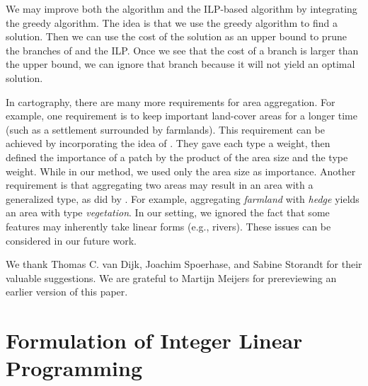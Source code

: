 \documentclass[acmsmall,natbib=false]{acmart}
\begin{document}
We may improve both the \Astar algorithm and the ILP-based 
algorithm by integrating the greedy algorithm.
The idea is that we use the greedy algorithm to find 
a solution. 
Then we can use the cost of the solution as an upper bound to 
prune the branches of \Astar and the ILP. 
Once we see that
the cost of a branch is larger than the upper bound,
we can ignore that branch  
because it will not yield an optimal solution.



In cartography, there are many more requirements 
for area aggregation.
For example, one requirement is 
to keep important land-cover areas for a longer time
(such as a settlement surrounded by farmlands).
This requirement can be achieved by incorporating the idea of
\textcite{Dilo2009tGAP}.
They gave each type a weight, 
then defined the importance of a patch 
by the product of the area size and the type weight.
While in our method, we used only the area size as importance.
%
Another requirement is that 
aggregating two areas may result in 
an area with a generalized type,
as did by \textcite{vanSmaalen2003}. 
For example, aggregating 
\emph{farmland} with \emph{hedge} 
yields an area with type \emph{vegetation}.
%
In our setting, we ignored the fact that
some features may inherently take linear forms
(e.g., rivers).
%
These issues can be considered in our future work.
%





\begin{acks}
We thank Thomas C. van Dijk, Joachim Spoerhase, 
and Sabine Storandt for their valuable suggestions.
We are grateful to Martijn Meijers for 
prereviewing an earlier version of this paper.
\end{acks}


\printbibliography

\clearpage

\appendix
\section{Formulation of Integer Linear Programming}
\label{app:AreaAgg_ILP}
\end{document}
